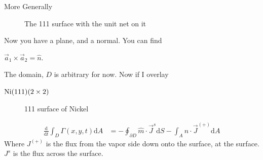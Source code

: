 \documentclass{article}
\renewcommand{\d}[0]{\mathrm{d}}
\newcommand{\dOne}[2]{\frac{\d #1}{\d #2}}
\newcommand{\aone}[0]{\vec{a}_1}
\newcommand{\atwo}[0]{\vec{a}_2}
\newcommand{\nhat}[0]{\hat{n}}
\begin{document}
\begin{section}{More Generally}
\begin{figure}[h]
	\centering
	\caption{The 111 surface with the unit net on it}
	\label{fig:111net}
\end{figure}
Now you have a plane, and a normal. You can find 

$\aone\times\atwo = \nhat$.

The domain, $D$ is arbitrary for now. Now if I overlay 

$\ce{Ni}(111)(2\times 2)$

\begin{figure}[h]
	\centering
	\caption{111 surface of Nickel}
	\label{fig:111surf}
\end{figure}

\begin{align*}
	\dOne{}{t}\int_{D}\Gamma(x,y,t)\d A &= - \oint_{\partial D}\hat{m}\cdot \vec{J}^s\d S - \int_{A}\nhat\cdot \vec{J}^{(+)}\d A
\end{align*}
Where $J^{(+)}$ is the flux from the vapor side down onto the surface, at the surface. $J^s$ is the flux across the surface.
\end{section}
\end{document}
